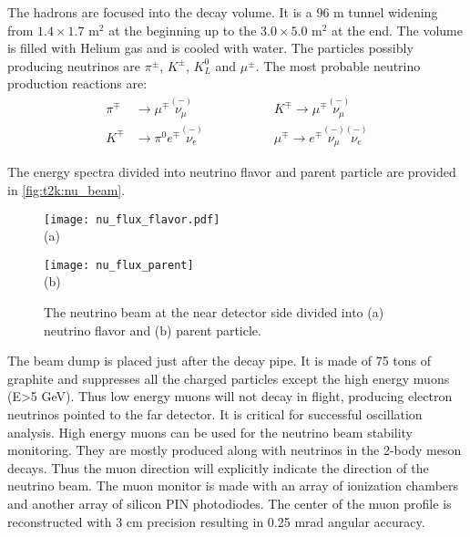 \documentclass[../main.tex]{subfiles}
\begin{document}
The hadrons are focused into the decay volume. It is a 96 m tunnel widening from $1.4\times1.7\text{ m}^2$ at the beginning up to the $3.0\times5.0 \text{ m}^2$ at the end. The volume is filled with Helium gas and is cooled with water. The particles possibly producing neutrinos are $\pi^\pm$, $K^\pm$, $K^0_L$ and $\mu^\pm$. The most probable neutrino production reactions are:
\begin{align}
\pi^\mp&\to\mu^\mp\overset{\scriptscriptstyle(-)}{\nu_\mu} \hspace{2cm} &K^\mp\to\mu^\mp\overset{\scriptscriptstyle(-)}{\nu_\mu} \\
K^\mp&\to\pi^0e^\mp\overset{\scriptscriptstyle(-)}{\nu_e} \hspace{2cm}  &\mu^\mp\to e^\mp\overset{\scriptscriptstyle(-)}{\nu_\mu}\overset{\scriptscriptstyle(-)}{\nu_e}
\end{align}

The energy spectra divided into neutrino flavor and parent particle are provided in \autoref{fig:t2k:nu_beam}.

\begin{figure}[!ht]
  \begin{minipage}{0.49\linewidth}
    \centering
    \texttt{[image: nu\_flux\_flavor.pdf]} \\ (a)
  \end{minipage}
  \begin{minipage}{0.49\linewidth}
    \centering
    \texttt{[image: nu\_flux\_parent]} \\ (b)
  \end{minipage}
  \caption{The neutrino beam at the near detector side divided into (a) neutrino flavor and (b) parent particle.}
  \label{fig:t2k:nu_beam}
\end{figure}

The beam dump is placed just after the decay pipe. It is made of 75 tons of graphite and suppresses all the charged particles except the high energy muons (E>5 GeV). Thus low energy muons will not decay in flight, producing electron neutrinos pointed to the far detector. It is critical for successful oscillation analysis. High energy muons can be used for the neutrino beam stability monitoring. They are mostly produced along with neutrinos in the 2-body meson decays. Thus the muon direction will explicitly indicate the direction of the neutrino beam. The muon monitor is made with an array of ionization chambers and another array of silicon PIN photodiodes. The center of the muon profile is reconstructed with 3 cm precision resulting in 0.25 mrad angular accuracy.
\end{document}
